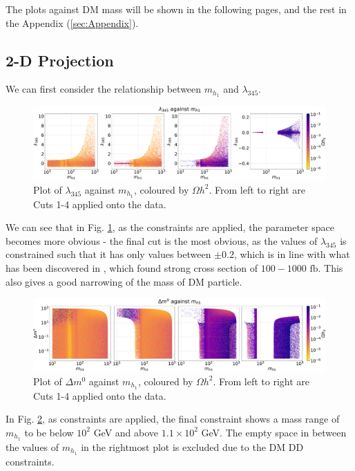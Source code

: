 \documentclass[12pt]{article}
\begin{document}
The plots against DM mass will be shown in the following pages, and the rest in the Appendix (\ref{sec:Appendix}).

\subsection{2-D Projection}
\label{sec:2D-proj}
We can first consider the relationship between $m_{h_1}$ and $\lambda_{345}$. 
\begin{figure}[ht]
    \centering
    \includegraphics[width=\linewidth]{4plot/l345_MD1.pdf}
    \caption{Plot of $\lambda_{345}$ against $m_{h_1}$, coloured by $\Omega h^2$. From left to right are Cuts 1-4 applied onto the data.}
    \label{fig:l345_md1_main}
\end{figure}

We can see that in Fig. \ref{fig:l345_md1_main}, as the constraints are applied, the parameter space becomes more obvious - the final cut is the most obvious, as the values of $\lambda_{345}$ is constrained such that it has only values between $\pm 0.2$, which is in line with what has been discovered in \cite{Belyaev:2018ext}, which found strong cross section of $100 - 1000 \text{ fb}$. This also gives a good narrowing of the mass of DM particle.

\begin{figure}[ht]
    \centering
    \includegraphics[width=\linewidth]{4plot/DM2_MD1.pdf}
    \caption{Plot of $\Delta m^0$ against $m_{h_1}$, coloured by $\Omega h^2$. From left to right are Cuts 1-4 applied onto the data.}
    \label{fig:DM2_md1_main}
\end{figure}

In Fig. \ref{fig:DM2_md1_main}, as constraints are applied, the final constraint shows a mass range of $m_{h_1}$ to be below $10^2$ GeV and above $1.1\times10^2$ GeV. The empty space in between the values of $m_{h_1}$ in the rightmost plot is excluded due to the DM DD constraints.
\end{document}
